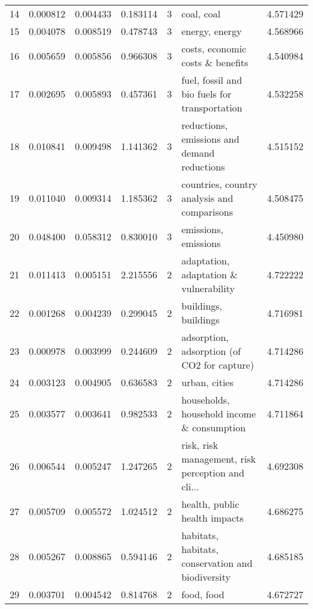 \begin{tabular}{lrrrrlr}
14  &    0.000812 &  0.004433 &        0.183114 &           3 &                                         coal, coal &  4.571429 \\
15  &    0.004078 &  0.008519 &        0.478743 &           3 &                                     energy, energy &  4.568966 \\
16  &    0.005659 &  0.005856 &        0.966308 &           3 &                   costs, economic costs \& benefits &  4.540984 \\
17  &    0.002695 &  0.005893 &        0.457361 &           3 &      fuel, fossil and bio fuels for transportation &  4.532258 \\
18  &    0.010841 &  0.009498 &        1.141362 &           3 &        reductions, emissions and demand reductions &  4.515152 \\
19  &    0.011040 &  0.009314 &        1.185362 &           3 &        countries, country analysis and comparisons &  4.508475 \\
20  &    0.048400 &  0.058312 &        0.830010 &           3 &                               emissions, emissions &  4.450980 \\
21  &    0.011413 &  0.005151 &        2.215556 &           2 &             adaptation, adaptation \& vulnerability &  4.722222 \\
22  &    0.001268 &  0.004239 &        0.299045 &           2 &                               buildings, buildings &  4.716981 \\
23  &    0.000978 &  0.003999 &        0.244609 &           2 &        adsorption, adsorption (of CO2 for capture) &  4.714286 \\
24  &    0.003123 &  0.004905 &        0.636583 &           2 &                                      urban, cities &  4.714286 \\
25  &    0.003577 &  0.003641 &        0.982533 &           2 &         households, household income \& consumption &  4.711864 \\
26  &    0.006544 &  0.005247 &        1.247265 &           2 &  risk, risk management, risk perception and cli... &  4.692308 \\
27  &    0.005709 &  0.005572 &        1.024512 &           2 &                      health, public health impacts &  4.686275 \\
28  &    0.005267 &  0.008865 &        0.594146 &           2 &  habitats, habitats, conservation and biodiversity &  4.685185 \\
29  &    0.003701 &  0.004542 &        0.814768 &           2 &                                         food, food &  4.672727 \\

\end{tabular}
